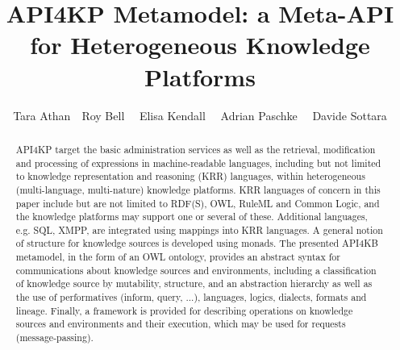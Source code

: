 \documentclass[runningheads]{llncs}
\title{API4KP Metamodel: a Meta-API for Heterogeneous Knowledge Platforms}
\date{}
\begin{document}
%
\author{Tara Athan\ \ Roy Bell \ \ Elisa Kendall \ \ Adrian Paschke \ \ Davide Sottara}

%
\maketitle

\begin{abstract}
API4KP target the basic administration services as well as the retrieval, modification and processing of expressions in machine-readable languages, including but not limited to knowledge representation and reasoning (KRR) languages, within heterogeneous (multi-language, multi-nature) knowledge platforms. KRR languages of concern in this paper include but are not limited to RDF(S), OWL, RuleML and Common Logic, and the knowledge platforms may support one or several of these. Additional languages, e.g. SQL, XMPP, are integrated using mappings into KRR languages. A general notion of structure for knowledge sources is developed using monads. The presented API4KB metamodel, in the form of an OWL ontology, provides an abstract syntax for communications about knowledge sources and environments, including a classification of knowledge source by mutability, structure, and an abstraction hierarchy as well as the use of performatives (inform, query, ...), languages, logics, dialects, formats and lineage. Finally, a framework is provided for describing operations on knowledge sources and environments and their execution, which may be used for requests (message-passing).
\end{abstract}

%
\end{document}
